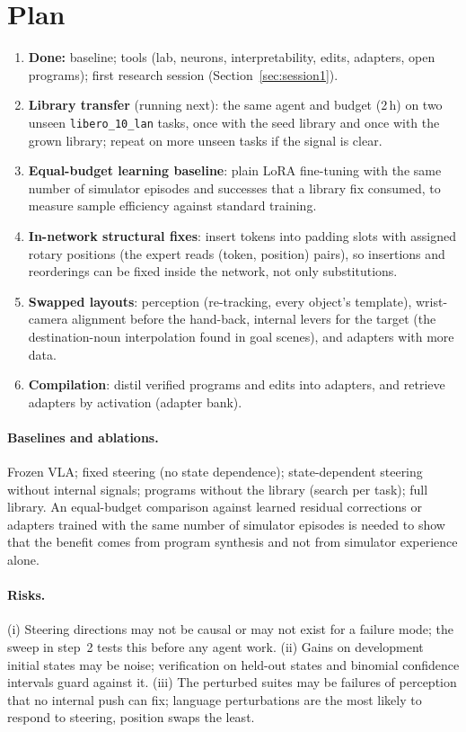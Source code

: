\documentclass[11pt]{article}
\begin{document}
\section{Plan}
\begin{enumerate}
\item \textbf{Done:} baseline; tools (lab, neurons, interpretability, edits, adapters, open programs); first research session
(Section~\ref{sec:session1}).
\item \textbf{Library transfer} (running next): the same agent and budget (2\,h) on two unseen \texttt{libero\_10\_lan} tasks, once
with the seed library and once with the grown library; repeat on more unseen tasks if the signal is clear.
\item \textbf{Equal-budget learning baseline}: plain LoRA fine-tuning with the same number of simulator episodes and successes that a
library fix consumed, to measure sample efficiency against standard training.
\item \textbf{In-network structural fixes}: insert tokens into padding slots with assigned rotary positions (the expert reads
(token, position) pairs), so insertions and reorderings can be fixed inside the network, not only substitutions.
\item \textbf{Swapped layouts}: perception (re-tracking, every object's template), wrist-camera alignment before the hand-back,
internal levers for the target (the destination-noun interpolation found in goal scenes), and adapters with more data.
\item \textbf{Compilation}: distil verified programs and edits into adapters, and retrieve adapters by activation (adapter bank).
\end{enumerate}

\paragraph{Baselines and ablations.} Frozen VLA; fixed steering (no state dependence); state-dependent steering without
internal signals; programs without the library (search per task); full library. An equal-budget comparison against learned
residual corrections or adapters trained with the same number of simulator episodes is needed to show that the benefit comes
from program synthesis and not from simulator experience alone.

\paragraph{Risks.} (i) Steering directions may not be causal or may not exist for a failure mode; the sweep in step~2 tests
this before any agent work. (ii) Gains on development initial states may be noise; verification on held-out states and
binomial confidence intervals guard against it. (iii) The perturbed suites may be failures of perception that no internal
push can fix; language perturbations are the most likely to respond to steering, position swaps the least.
\end{document}
